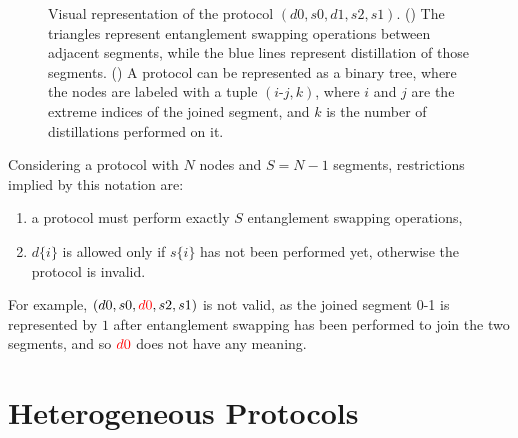 \documentclass{article}
\begin{document}
\begin{figure}[ht!]
\begin{subfigure}[b]{0.45\textwidth}
    \caption{}
    \label{fig:triangle_notation}
  \end{subfigure}
  \hfill
  \begin{subfigure}[b]{0.45\textwidth}
    \centering
    \caption{}
    \label{fig:binary_tree_notation}
  \end{subfigure}
  \label{fig:notation}
  \caption{Visual representation of the protocol $(d0, s0, d1, s2, s1)$. () The triangles represent entanglement swapping operations between adjacent segments, while the blue lines represent distillation of those segments. () A protocol can be represented as a binary tree, where the nodes are labeled with a tuple $(i\text{-}j, k)$, where $i$ and $j$ are the extreme indices of the joined segment, and $k$ is the number of distillations performed on it.}
\end{figure}
 
Considering a protocol with $N$ nodes and $S=N-1$ segments, restrictions implied by this notation are:
\begin{enumerate}
  \item a protocol must perform exactly $S$ entanglement swapping operations,
  \item $d\{i\}$ is allowed only if $s\{i\}$ has not been performed yet, otherwise the protocol is invalid.
\end{enumerate}

For example, $(d0, s0, \textcolor{red}{d0}, s2, s1)$ is not valid, as the joined segment 0-1 is represented by $1$ after entanglement swapping has been performed to join the two segments, and so $\textcolor{red}{d0}$ does not have any meaning.

\clearpage
\section*{Heterogeneous Protocols}
\end{document}
